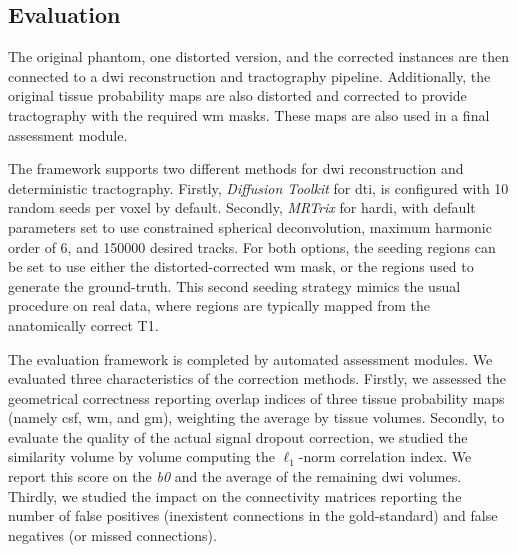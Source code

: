\subsection{Evaluation}
\label{sec:evaluation}
The original phantom, one distorted version, and
the corrected instances are then connected to a
\gls*{dwi} reconstruction and tractography pipeline.
Additionally, the original tissue probability maps
are also distorted and corrected to provide tractography
with the required \gls*{wm} masks.
These maps are also used in a final assessment module.

The framework supports two different methods for
\gls*{dwi} reconstruction and deterministic tractography.
Firstly, \emph{Diffusion Toolkit} \cite{wang_diffusion_2007}
for \gls*{dti}, is configured with 10 random
seeds per voxel by default. Secondly, \emph{MRTrix}
\cite{tournier_mrtrix:_2012} for \gls*{hardi}, with
default parameters set to use constrained spherical
deconvolution, maximum harmonic order of 6, and 150000
desired tracks.
For both options, the seeding regions can be set to use
either the distorted-corrected \gls*{wm} mask, or the 
regions used to generate the ground-truth. This second
seeding strategy mimics the usual procedure on real 
data, where regions are typically mapped from the
anatomically correct T1.

The evaluation framework is completed by automated 
assessment modules. We evaluated three characteristics
of the correction methods. 
Firstly, we assessed the geometrical correctness
reporting overlap indices of three tissue
probability maps (namely \gls*{csf}, \gls*{wm},
and \gls*{gm}), weighting the average by tissue
volumes.
Secondly, to evaluate the quality of the actual 
signal dropout correction, we studied the 
similarity volume by volume computing the $\ell_1$-norm
correlation index. We report this score
on the \textit{b0} and the average of the remaining \gls*{dwi}
volumes. Thirdly, we studied the impact on the
connectivity matrices reporting the number of
false positives (inexistent connections in the
gold-standard) and false negatives (or missed connections).